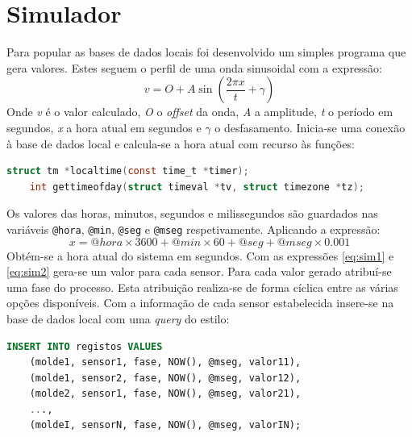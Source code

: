 \documentclass[11pt,twoside,a4paper]{report}
\begin{document}
\section{Simulador}
Para popular as bases de dados locais foi desenvolvido um simples programa que gera valores. Estes seguem o perfil de uma onda sinusoidal com a expressão:
\begin{equation}
v = O + A\sin(\frac{2 \pi x}{t} + \gamma)
\label{eq:sim1}
\end{equation}
Onde \textit{v} é o valor calculado, \textit{O} o \textit{offset} da onda, \textit{A} a amplitude, \textit{t} o período em segundos, \textit{x} a hora atual em segundos e $ \gamma $ o desfasamento. Inicia-se uma conexão à base de dados local e calcula-se a hora atual com recurso às funções:
\begin{lstlisting}[language = C]
	struct tm *localtime(const time_t *timer);
	int gettimeofday(struct timeval *tv, struct timezone *tz);
\end{lstlisting}
Os valores das horas, minutos, segundos e milissegundos são guardados nas variáveis \texttt{@hora}, \texttt{@min}, \texttt{@seg} e \texttt{@mseg} respetivamente. Aplicando a expressão:
\begin{equation}
x = @hora \times 3600 + @min \times 60 + @seg + @mseg \times 0.001
\label{eq:sim2}
\end{equation}
Obtém-se a hora atual do sistema em segundos. Com as expressões \ref{eq:sim1} e \ref{eq:sim2} gera-se um valor para cada sensor. Para cada valor gerado atribuí-se uma fase do processo. Esta atribuição realiza-se de forma cíclica entre as várias opções disponíveis. Com a informação de cada sensor estabelecida insere-se na base de dados local com uma \textit{query} do estilo:
\begin{lstlisting}[language = SQL]
	INSERT INTO registos VALUES
	(molde1, sensor1, fase, NOW(), @mseg, valor11),
	(molde1, sensor2, fase, NOW(), @mseg, valor12),
	(molde2, sensor1, fase, NOW(), @mseg, valor21),
	...,
	(moldeI, sensorN, fase, NOW(), @mseg, valorIN);
\end{lstlisting}
\end{document}
